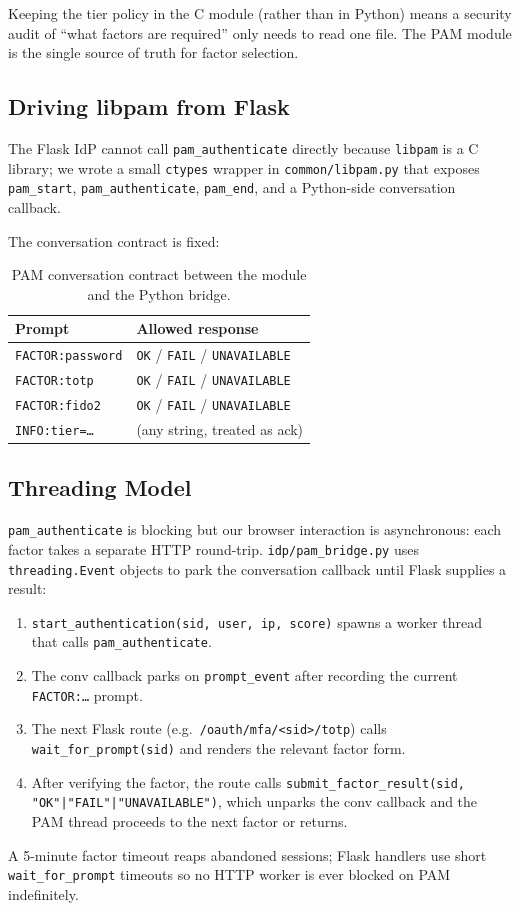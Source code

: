 Keeping the tier policy in the C module (rather than in Python) means
a security audit of ``what factors are required'' only needs to read one
file. The PAM module is the single source of truth for factor selection.

\subsection{Driving libpam from Flask}
The Flask IdP cannot call \texttt{pam\_authenticate} directly because
\texttt{libpam} is a C library; we wrote a small \texttt{ctypes} wrapper
in \texttt{common/libpam.py} that exposes
\texttt{pam\_start}, \texttt{pam\_authenticate}, \texttt{pam\_end}, and a
Python-side conversation callback.

The conversation contract is fixed:

\begin{table}[h]
\centering
\caption{PAM conversation contract between the module and the Python bridge.}
\label{tab:pam-conv}
\scriptsize
\begin{tabular}{ll}
\toprule
\textbf{Prompt} & \textbf{Allowed response} \\
\midrule
\texttt{FACTOR:password} & \texttt{OK} / \texttt{FAIL} / \texttt{UNAVAILABLE} \\
\texttt{FACTOR:totp}     & \texttt{OK} / \texttt{FAIL} / \texttt{UNAVAILABLE} \\
\texttt{FACTOR:fido2}    & \texttt{OK} / \texttt{FAIL} / \texttt{UNAVAILABLE} \\
\texttt{INFO:tier=\dots} & (any string, treated as ack) \\
\bottomrule
\end{tabular}
\end{table}

\subsection{Threading Model}
\texttt{pam\_authenticate} is blocking but our browser interaction is
asynchronous: each factor takes a separate HTTP round-trip.
\texttt{idp/pam\_bridge.py} uses \texttt{threading.Event} objects to
park the conversation callback until Flask supplies a result:

\begin{enumerate}
  \item \texttt{start\_authentication(sid, user, ip, score)} spawns a
    worker thread that calls \texttt{pam\_authenticate}.
  \item The conv callback parks on \texttt{prompt\_event} after recording
    the current \texttt{FACTOR:\dots} prompt.
  \item The next Flask route (e.g.\ \texttt{/oauth/mfa/<sid>/totp})
    calls \texttt{wait\_for\_prompt(sid)} and renders the relevant
    factor form.
  \item After verifying the factor, the route calls
    \texttt{submit\_factor\_result(sid, "OK"|"FAIL"|"UNAVAILABLE")},
    which unparks the conv callback and the PAM thread proceeds to the
    next factor or returns.
\end{enumerate}

A 5-minute factor timeout reaps abandoned sessions; Flask handlers use
short \texttt{wait\_for\_prompt} timeouts so no HTTP worker is ever
blocked on PAM indefinitely.

